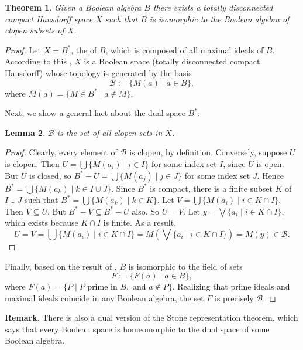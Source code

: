 \documentclass[12pt]{article}
\newtheorem{thm}{Theorem}
\newtheorem{lem}[thm]{Lemma}
\theoremstyle{definition}
\theoremstyle{remark}
\numberwithin{equation}{subsection}
\begin{document}
\begin{thm}
Given a Boolean algebra $B$ there exists a totally disconnected compact
Hausdorff space $X$ such that $B$ is isomorphic to the Boolean algebra 
of clopen subsets of $X$.
\end{thm}

\begin{proof}
Let $X=B^*$, the  of $B$, which is composed of all maximal ideals of $B$.  According to this , $X$ is a Boolean space (totally disconnected compact Hausdorff) whose topology is generated by the basis $$\mathcal{B}:=\lbrace M(a)\mid a\in B\rbrace,$$ where $M(a)=\lbrace M\in B^* \mid a\notin M\rbrace$.

Next, we show a general fact about the dual space $B^*$:
\begin{lem} $\mathcal{B}$ is the set of \emph{all} clopen sets in $X$. \end{lem}
\begin{proof}  Clearly, every element of $\mathcal{B}$ is clopen, by definition.  Conversely, suppose $U$ is clopen.  Then $U=\bigcup \lbrace M(a_i)\mid i\in I\rbrace$ for some index set $I$, since $U$ is open.  But $U$ is closed, so $B^*-U=\bigcup \lbrace M(a_j) \mid j\in J\rbrace$ for some index set $J$.  Hence $B^*=\bigcup \lbrace M(a_k) \mid k\in I\cup J \rbrace$.  Since $B^*$ is compact, there is a finite subset $K$ of $I\cup J$ such that $B^* =\bigcup \lbrace M(a_k)\mid k\in K\rbrace$.  Let $V= \bigcup \lbrace M(a_i)\mid i\in K\cap I\rbrace$.  Then $V\subseteq U$.  But $B^*-V \subseteq B^*-U$ also.  So $U=V$.  Let $y=\bigvee \lbrace a_i \mid i\in K\cap I\rbrace$, which exists because $K\cap I$ is finite.  As a result, $$U=V= \bigcup \lbrace M(a_i)\mid i\in K\cap I\rbrace = M(\bigvee \lbrace a_i\mid i\in K\cap I\rbrace)=M(y)\in \mathcal{B}.$$
\end{proof}

Finally, based on the result of , $B$ is isomorphic to the field of sets $$F:=\lbrace F(a)\mid a\in B\rbrace,$$ where $F(a)=\lbrace P\mid P\mbox{ prime in }B,\mbox{ and }a\notin P\rbrace$.  Realizing that prime ideals and maximal ideals coincide in any Boolean algebra, the set $F$ is precisely $\mathcal{B}$.
\end{proof}

\textbf{Remark}.  There is also a dual version of the Stone representation theorem, which says that every Boolean space is homeomorphic to the dual space of some Boolean algebra.
\end{document}

